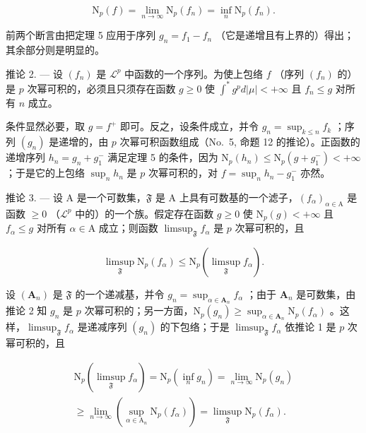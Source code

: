 \[
\mathrm{N} _ {p} (f) = \lim _ {n \rightarrow \infty} \mathrm{N} _ {p} (f _ {n}) = \inf _ {n} \mathrm{N} _ {p} (f _ {n}).
\]

前两个断言由把定理 5 应用于序列 \(g_{n} = f_{1} - f_{n}\) （它是递增且有上界的）得出；其余部分则是明显的。

推论 2. --- 设 \((f_n)\) 是 \(\mathcal{L}^p\) 中函数的一个序列。为使上包络 \(f\) （序列 \((f_n)\) 的）是 \(p\) 次幂可积的，必须且只须存在函数 \(g \geqslant 0\) 使 \(\int^{*} g^p d|\mu| < +\infty\) 且 \(f_n \leqslant g\) 对所有 \(n\) 成立。

条件显然必要，取 \(g = f^{+}\) 即可。反之，设条件成立，并令 \(g_{n} = \sup_{k\leqslant n}f_{k}\) ；序列 \((g_{n})\) 是递增的，由 \(p\) 次幂可积函数组成（No.~5, 命题 12 的推论）。正函数的递增序列 \(h_n = g_n + g_1^-\) 满足定理 5 的条件，因为 \(\mathrm{N}_p(h_n)\leqslant \mathrm{N}_p(g + g_1^-) < +\infty\) ；于是它的上包络 \(\sup_{n}h_{n}\) 是 \(p\) 次幂可积的，对 \(f = \sup_{n}h_{n} - g_{1}^{-}\) 亦然。

推论 3. --- 设 A 是一个可数集，\(\mathfrak{F}\) 是 A 上具有可数基的一个滤子，\((f_{\alpha})_{\alpha \in \mathrm{A}}\) 是函数 \(\geqslant 0\) （\(\mathcal{L}^p\) 中的）的一个族。假定存在函数 \(g \geqslant 0\) 使 \(\mathrm{N}_p(g) < +\infty\) 且 \(f_{\alpha} \leqslant g\) 对所有 \(\alpha \in \mathrm{A}\) 成立；则函数 \(\limsup_{\mathfrak{F}} f_{\alpha}\) 是 \(p\) 次幂可积的，且

\[
\limsup _ {\mathfrak {F}} \mathrm{N} _ {p} (f _ {\alpha}) \leqslant \mathrm{N} _ {p} (\limsup _ {\mathfrak {F}} f _ {\alpha}).\tag{12}
\]

设 \((\mathbf{A}_n)\) 是 \(\mathfrak{F}\) 的一个递减基，并令 \(g_{n} = \sup_{\alpha \in \mathbf{A}_{n}}f_{\alpha}\) ；由于 \(\mathbf{A}_n\) 是可数集，由推论 2 知 \(g_{n}\) 是 \(p\) 次幂可积的；另一方面，\(\mathrm{N}_p(g_n)\geqslant \sup_{\alpha \in \mathbf{A}_n}\mathrm{N}_p(f_\alpha)\) 。这样，\(\limsup_{\mathfrak{F}}f_{\alpha}\) 是递减序列 \((g_n)\) 的下包络；于是 \(\limsup_{\mathfrak{F}}f_{\alpha}\) 依推论 1 是 \(p\) 次幂可积的，且

\[
\begin{array}{l} \mathrm{N} _ {p} (\limsup _ {\mathfrak {F}} f _ {\alpha}) = \mathrm{N} _ {p} \left(\inf _ {n} g _ {n}\right) = \lim _ {n \to \infty} \mathrm{N} _ {p} (g _ {n}) \\ \geqslant \lim _ {n \to \infty} \left(\sup _ {\alpha \in \mathrm{A} _ {n}} \mathrm{N} _ {p} (f _ {\alpha})\right) = \limsup _ {\mathfrak {F}} \mathrm{N} _ {p} (f _ {\alpha}). \end{array}
\]

